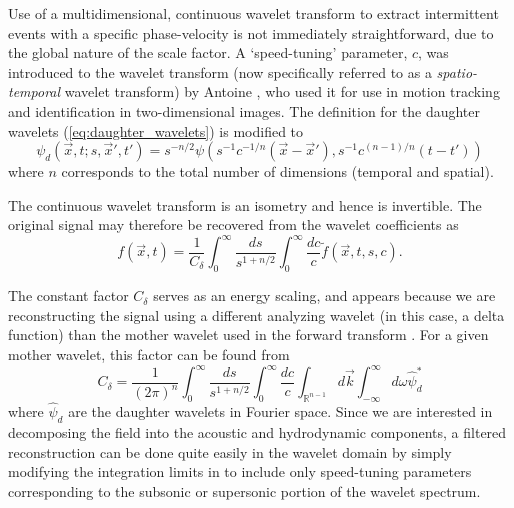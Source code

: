 Use of a multidimensional, continuous wavelet transform to extract intermittent events with a specific phase-velocity is not immediately straightforward, due to the global nature of the scale factor. 
A `speed-tuning' parameter, $c$, was introduced to the wavelet transform (now specifically referred to as a \textit{spatio-temporal} wavelet transform) by Antoine \etal \citep{Antoine2004}, who used it for use in motion tracking and identification in two-dimensional images. 
The definition for the daughter wavelets (\ref{eq:daughter_wavelets}) is modified to
\begin{equation}
	\psi_d \left( \vec{x}, t;s,\vec{x}', t' \right) = s^{-n/2} \psi \left(s^{-1} c^{-1/n} (\vec{x}-\vec{x}'), s^{-1} c^{(n-1)/n} (t-t') \right)
\end{equation} 
where $n$ corresponds to the total number of dimensions (temporal and spatial).

The continuous wavelet transform is an isometry \citep{Antoine2004} and hence is invertible.
The original signal may therefore be recovered from the wavelet coefficients as 
\begin{equation}
	f(\vec{x},t) = \frac{1}{C_\delta} \int_0^\infty \frac{ds}{s^{1 + n/2}} \int_{0}^{\infty} \frac{dc}{c} \tilde{f} (\vec{x},t,s,c).
	\label{eq:wavelet_filter}
\end{equation}

The constant factor $C_\delta$ serves as an energy scaling, and appears because we are reconstructing the signal using a different analyzing wavelet (in this case, a delta function) than the mother wavelet used in the forward transform \citep{Torrence1998,Farge1992,Antoine2004}. 
For a given mother wavelet, this factor can be found from
\begin{equation}
	C_\delta = \frac{1}{(2 \pi)^n} \int_0^\infty \frac{ds}{s^{1 + n/2}} \int_{0}^{\infty} \frac{dc}{c} \int_{\mathbb{R}^{n-1}} d \vec{k} \int_{-\infty}^{\infty} d\omega \hat{\psi}_d^*
\end{equation}
where $\hat{\psi}_d$ are the daughter wavelets in Fourier space. 
Since we are interested in decomposing the field into the acoustic and hydrodynamic components, a filtered reconstruction can be done quite easily in the wavelet domain by simply modifying the integration limits in  to include only speed-tuning parameters corresponding to the subsonic or supersonic portion of the wavelet spectrum.

